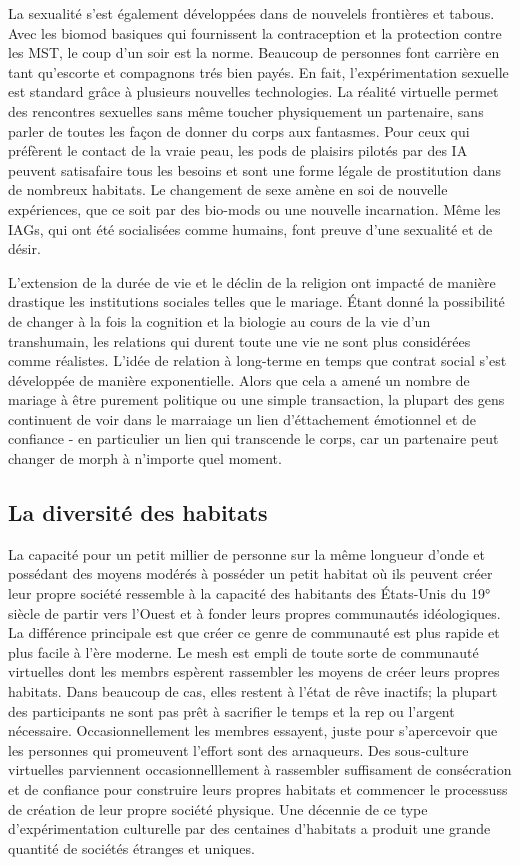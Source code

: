 La sexualité s'est également développées dans de nouvelels frontières et tabous. Avec les biomod basiques qui fournissent la contraception et la protection contre les MST, le coup d'un soir est la norme. Beaucoup de personnes font carrière en tant qu'escorte et compagnons trés bien payés. En fait, l'expérimentation sexuelle est standard grâce à plusieurs nouvelles technologies. La réalité virtuelle permet des rencontres sexuelles sans même toucher physiquement un partenaire, sans parler de toutes les façon de donner du corps aux fantasmes. Pour ceux qui préfèrent le contact de la vraie peau, les pods de plaisirs pilotés par des IA peuvent satisafaire tous les besoins et sont une forme légale de prostitution dans de nombreux habitats. Le changement de sexe amène en soi de nouvelle expériences, que ce soit par des bio-mods ou une nouvelle incarnation. Même les IAGs, qui ont été socialisées comme humains, font preuve d'une sexualité et de désir. 

L'extension de la durée de vie et le déclin de la religion ont impacté de manière drastique les institutions sociales telles que le mariage. Étant donné la possibilité de changer à la fois la cognition et la biologie au cours de la vie d'un transhumain, les relations qui durent toute une vie ne sont plus considérées comme réalistes. L'idée de relation à long-terme en temps que contrat social s'est développée de manière exponentielle. Alors que cela a amené un nombre de mariage à être purement politique ou une simple transaction, la plupart des gens continuent de voir dans le marraiage un lien d'éttachement émotionnel et de confiance - en particulier un lien qui transcende le corps, car un partenaire peut changer de morph à n'importe quel moment. 

\subsection{La diversité des habitats} \label{sec:diversity-habitats} 

La capacité pour un petit millier de personne sur la même longueur d'onde et possédant des moyens modérés à posséder un petit habitat où ils peuvent créer leur propre société ressemble à la capacité des habitants des États-Unis du 19° siècle de partir vers l'Ouest et à fonder leurs propres communautés idéologiques. La différence principale est que créer ce genre de communauté est plus rapide et plus facile à l'ère moderne. Le mesh est empli de toute sorte de communauté virtuelles dont les membrs espèrent rassembler les moyens de créer leurs propres habitats. Dans beaucoup de cas, elles restent à l'état de rêve inactifs; la plupart des participants ne sont pas prêt à sacrifier le temps et la rep ou l'argent nécessaire. Occasionnellement les membres essayent, juste pour s'apercevoir que les personnes qui promeuvent l'effort sont des arnaqueurs. Des sous-culture virtuelles parviennent occasionnelllement à rassembler suffisament de consécration et de confiance pour construire leurs propres habitats et commencer le processuss de création de leur propre société physique. Une décennie de ce type d'expérimentation culturelle par des centaines d'habitats a produit une grande quantité de sociétés étranges et uniques. 

